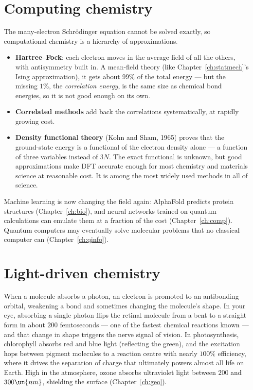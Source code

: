\section{Computing chemistry}

The many-electron Schr\"odinger equation cannot be solved exactly, so computational chemistry is a hierarchy of approximations.
\begin{itemize}[itemsep=3pt]
  \item \textbf{Hartree--Fock}: each electron moves in the average field of all the others, with antisymmetry built in. A mean-field theory (like Chapter~\ref{ch:statmech}'s Ising approximation), it gets about $99\%$ of the total energy --- but the missing $1\%$, the \emph{correlation energy}, is the same size as chemical bond energies, so it is not good enough on its own.
  \item \textbf{Correlated methods} add back the correlations systematically, at rapidly growing cost.
  \item \textbf{Density functional theory} (Kohn and Sham, 1965) proves that the ground-state energy is a functional of the electron density alone --- a function of three variables instead of $3N$. The exact functional is unknown, but good approximations make DFT accurate enough for most chemistry and materials science at reasonable cost. It is among the most widely used methods in all of science.
\end{itemize}
Machine learning is now changing the field again: AlphaFold predicts protein structures (Chapter~\ref{ch:bio}), and neural networks trained on quantum calculations can emulate them at a fraction of the cost (Chapter~\ref{ch:comp}). Quantum computers may eventually solve molecular problems that no classical computer can (Chapter~\ref{ch:qinfo}).

\section{Light-driven chemistry}

When a molecule absorbs a photon, an electron is promoted to an antibonding orbital, weakening a bond and sometimes changing the molecule's shape. In your eye, absorbing a single photon flips the retinal molecule from a bent to a straight form in about $200$ femtoseconds --- one of the fastest chemical reactions known --- and that change in shape triggers the nerve signal of vision. In photosynthesis, chlorophyll absorbs red and blue light (reflecting the green), and the excitation hops between pigment molecules to a reaction centre with nearly $100\%$ efficiency, where it drives the separation of charge that ultimately powers almost all life on Earth. High in the atmosphere, ozone absorbs ultraviolet light between $200$ and $300\un{nm}$, shielding the surface (Chapter~\ref{ch:geo}).

